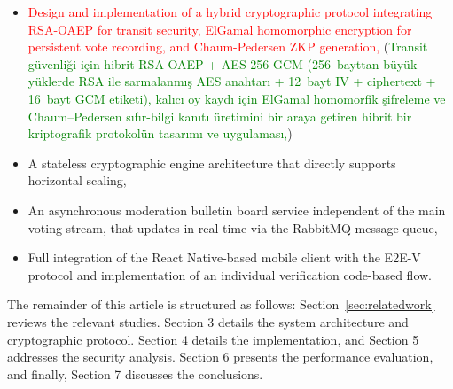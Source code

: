 \documentclass[a4paper,fleqn]{cas-sc}
\begin{document}
\begin{itemize}
  \item[(i)] %
               \textcolor{red}{Design and implementation of a hybrid cryptographic protocol integrating RSA-OAEP for transit security, ElGamal homomorphic encryption for persistent vote recording, and Chaum-Pedersen ZKP generation,}
               (\textcolor{green}{Transit güvenliği için hibrit RSA-OAEP + AES-256-GCM (256~bayttan büyük yüklerde RSA ile sarmalanmış AES anahtarı + 12~bayt IV + ciphertext + 16~bayt GCM etiketi), kalıcı oy kaydı için ElGamal homomorfik şifreleme ve Chaum--Pedersen sıfır-bilgi kanıtı üretimini bir araya getiren hibrit bir kriptografik protokolün tasarımı ve uygulaması,})
  \item[(ii)]  %
                A stateless cryptographic engine architecture that directly supports horizontal scaling,
  \item[(iii)] %
                An asynchronous moderation bulletin board service independent of the main voting stream, that updates in real-time via the RabbitMQ message queue,
  \item[(iv)]  %
                Full integration of the React Native-based mobile client with the E2E-V protocol and implementation of an individual verification code-based flow.
\end{itemize}


The remainder of this article is structured as follows: Section~\ref{sec:relatedwork} reviews the relevant studies. Section 3 details the system architecture and cryptographic protocol. Section 4 details the implementation, and Section 5 addresses the security analysis. Section 6 presents the performance evaluation, and finally, Section 7 discusses the conclusions.
\end{document}
